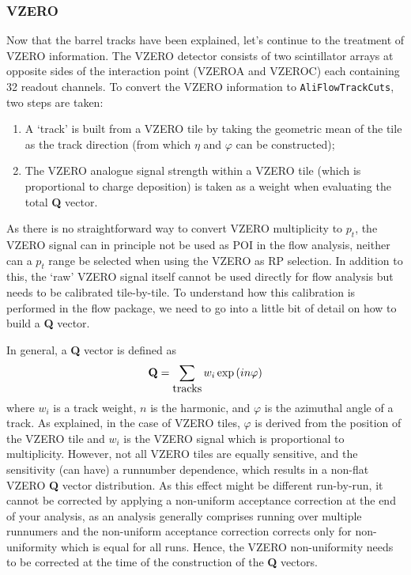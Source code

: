 \documentclass[a4paper]{book}
\numberwithin{equation}{subsection}
\begin{document}
\subsubsection{VZERO}
Now that the barrel tracks have been explained, let's continue to the treatment of VZERO information. The VZERO detector consists of two scintillator arrays at opposite sides of the interaction point (VZEROA and VZEROC) each containing 32 readout channels. To convert the VZERO information to \texttt{AliFlowTrackCuts}, two steps are taken:
\begin{enumerate}
\item A `track' is built from a VZERO tile by taking the geometric mean of the tile as the track direction (from which $\eta$ and $\varphi$ can be constructed);
\item The VZERO analogue signal strength within a VZERO tile (which is proportional to charge deposition) is taken as a weight when evaluating the total \textbf{Q} vector.
\end{enumerate}
As there is no straightforward way to convert VZERO multiplicity to $p_t$, the VZERO signal can in principle not be used as POI in the flow analysis, neither can a $p_t$ range be selected when using the VZERO as RP selection. In addition to this, the `raw' VZERO signal itself cannot be used directly for flow analysis  but needs to be calibrated tile-by-tile. To understand how this calibration is performed in the flow package, we need to go into a little bit of detail on how to build a \textbf{Q} vector. 

In general, a \textbf{Q} vector is defined as
\begin{equation}\label{qvzero}
\mbox{\textbf{Q}} = \sum_{\mbox{tracks}} w_i \exp \left( i n \varphi \right)
\end{equation}
where $w_i$ is a track weight, $n$ is the harmonic, and $\varphi$ is the azimuthal angle of a track.  As explained, in the case of VZERO tiles, $\varphi$ is derived from the position of the VZERO tile and $w_i$ is the VZERO signal which is proportional to multiplicity. However, not all VZERO tiles are equally sensitive, and the sensitivity (can have) a runnumber dependence, which results in a non-flat VZERO \textbf{Q} vector distribution. As this effect might be different run-by-run, it cannot be corrected by applying a non-uniform acceptance correction at the end of your analysis, as an analysis generally comprises running over multiple runnumers and the non-uniform acceptance correction corrects only for non-uniformity which is equal for all runs. Hence, the VZERO non-uniformity needs to be corrected at the time of the construction of the \textbf{Q} vectors.
\end{document}

